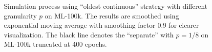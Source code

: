 \begin{figure}

\caption{Simulation process using ``oldest continuous'' strategy with different granularity $p$ on ML-100k. The results are smoothed using exponential moving average with smoothing factor 0.9 for clearer visualization.
The black line denotes the ``separate'' with $p{=}1/8$ on ML-100k truncated at 400 epochs. %
}
\label{fig:granularity}
\end{figure}
